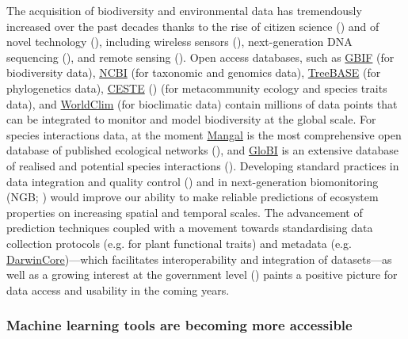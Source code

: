 \begin{refsection}
The acquisition of biodiversity and environmental data has tremendously
increased over the past decades thanks to the rise of citizen science
(\cite{Dickinson2010CitSci}) and of novel technology
(\cite{Stephenson2020TecAdv}), including wireless sensors
(\cite{Porter2005WirSen}), next-generation DNA sequencing
(\cite{Creer2016EcoSF}), and remote sensing (\cite{Skidmore2015AgrBio,
Lausch2016LinEar}). Open access databases, such as
\href{https://www.gbif.org/}{GBIF} (for biodiversity data),
\href{https://www.ncbi.nlm.nih.gov/}{NCBI} (for taxonomic and genomics
data), \href{https://www.treebase.org/treebase-web/home.html}{TreeBASE}
(for phylogenetics data), \href{https://icestes.github.io/}{CESTE}
(\cite{Jeliazkov2020GloDat}) (for metacommunity ecology and species traits
data), and \href{https://www.worldclim.org/data/bioclim.html}{WorldClim}
(for bioclimatic data) contain millions of data points that can be
integrated to monitor and model biodiversity at the global scale. For
species interactions data, at the moment
\href{https://mangal.io/#/}{Mangal} is the most comprehensive open
database of published ecological networks (\cite{Poisot2016ManMak}), and
\href{https://www.globalbioticinteractions.org/about}{GloBI} is an
extensive database of realised and potential species interactions
(\cite{Poelen2014Global}). Developing standard practices in data
integration and quality control (\cite{Kissling2018BuiEss}) and in
next-generation biomonitoring (NGB; \cite{Makiola2020KeyQue}) would
improve our ability to make reliable predictions of ecosystem properties
on increasing spatial and temporal scales. The advancement of prediction
techniques coupled with a movement towards standardising data collection
protocols (e.g. \cite{Perez-Harguindeguy2013NewHan} for plant functional
traits) and metadata (e.g.
\href{https://www.tdwg.org}{DarwinCore})---which facilitates
interoperability and integration of datasets---as well as a growing
interest at the government level (\cite{Scholes2012BuiGlo}) paints a
positive picture for data access and usability in the coming years.

\subsubsection{Machine learning tools are becoming more
accessible}\label{machine-learning-tools-are-becoming-more-accessible}


\end{refsection}
